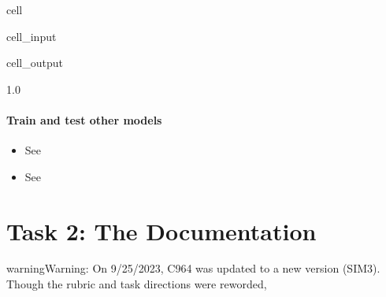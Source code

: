 \documentclass[letterpaper,10pt,english]{jupyterBook}
\begin{document}
\begin{sphinxuseclass}{cell}\begin{sphinxVerbatimInput}

\begin{sphinxuseclass}{cell_input}
\begin{sphinxVerbatim}[commandchars=\\\{\}]
  
\end{sphinxVerbatim}

\end{sphinxuseclass}\end{sphinxVerbatimInput}
\begin{sphinxVerbatimOutput}

\begin{sphinxuseclass}{cell_output}
\begin{sphinxVerbatim}[commandchars=\\\{\}]
1.0
\end{sphinxVerbatim}

\end{sphinxuseclass}\end{sphinxVerbatimOutput}

\end{sphinxuseclass}

\subsubsection{Train and test other models}
\label{\detokenize{task2_c/example_sup_reg/sup_reg_ex_accuracy:train-and-test-other-models}}\begin{itemize}
\item {} 
\sphinxAtStartPar
See 

\item {} 
\sphinxAtStartPar
See 

\end{itemize}

\sphinxstepscope


\chapter{Task 2: The Documentation}
\label{\detokenize{task2_doc/task2_doc:task-2-the-documentation}}\label{\detokenize{task2_doc/task2_doc::doc}}
\begin{sphinxadmonition}{warning}{Warning:}
\sphinxAtStartPar
On 9/25/2023, C964 was updated to a new version (SIM3). Though the rubric and task directions were reworded, 
\end{sphinxadmonition}
\end{document}
